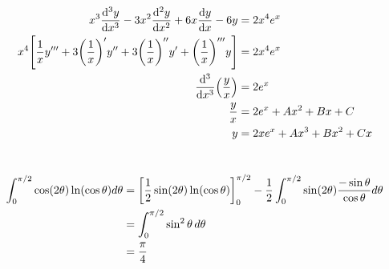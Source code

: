 \documentclass[../ap_2013.tex]{subfiles}
\begin{document}
\subsection{}
\begin{equation}\begin{aligned}[b]
    x^3\dv[3]{y}{x}-3x^2\dv[2]{y}{x}+6x\dv{y}{x}-6y &= 2x^4e^x\\
    x^4\qty[\frac{1}{x}y'''+3\qty(\frac{1}{x})'y''+3\qty(\frac{1}{x})''y'+\qty(\frac{1}{x})'''y] &= 2x^4e^x\\
    \dv[3]{x}\qty(\frac{y}{x}) &= 2e^x\\
    \frac{y}{x} &= 2e^x +Ax^2+Bx+C\\
    y &= 2xe^x+Ax^3+Bx^2+Cx
\end{aligned}\end{equation}

\section{}
\begin{equation}\begin{aligned}[b]
    \int_0^{\pi/2}\cos(2\theta)\ln(\cos\theta)d\theta
    &=\qty[\frac{1}{2}\sin(2\theta)\ln(\cos\theta)]_{0}^{\pi/2}-\frac{1}{2}\int_{0}^{\pi/2} \sin(2\theta)\frac{-\sin\theta}{\cos\theta}d\theta\\
    &= \int_{0}^{\pi/2} \sin^2\theta\,d\theta\\
    &= \frac{\pi}{4}
\end{aligned}\end{equation}
\end{document}

